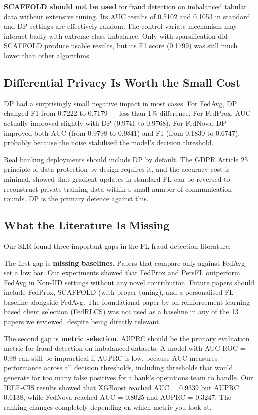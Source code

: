 \documentclass[12pt, a4paper]{article}
\begin{document}
\textbf{SCAFFOLD should not be used} for fraud detection on imbalanced tabular data without extensive tuning. Its AUC results of 0.5102 and 0.1053 in standard and DP settings are effectively random. The control variate mechanism may interact badly with extreme class imbalance. Only with sparsification did SCAFFOLD produce usable results, but its F1 score (0.1799) was still much lower than other algorithms.

\subsection{Differential Privacy Is Worth the Small Cost}

DP had a surprisingly small negative impact in most cases. For FedAvg, DP changed F1 from 0.7222 to 0.7179 --- less than 1\% difference. For FedProx, AUC actually improved slightly with DP (0.9741 to 0.9768). For FedNova, DP improved both AUC (from 0.9798 to 0.9841) and F1 (from 0.1830 to 0.6747), probably because the noise stabilised the model's decision threshold.

Real banking deployments should include DP by default. The GDPR Article 25 principle of data protection by design requires it, and the accuracy cost is minimal. \citet{zhu2019deep} showed that gradient updates in standard FL can be reversed to reconstruct private training data within a small number of communication rounds. DP is the primary defence against this.

\subsection{What the Literature Is Missing}

Our SLR found three important gaps in the FL fraud detection literature.

The first gap is \textbf{missing baselines}. Papers that compare only against FedAvg set a low bar. Our experiments showed that FedProx and PersFL outperform FedAvg in Non-IID settings without any novel contribution. Future papers should include FedProx, SCAFFOLD (with proper tuning), and a personalised FL baseline alongside FedAvg. The foundational paper by \citet{wang2023fedrlcs} on reinforcement learning-based client selection (FedRLCS) was not used as a baseline in any of the 13 papers we reviewed, despite being directly relevant.

The second gap is \textbf{metric selection}. AUPRC should be the primary evaluation metric for fraud detection on imbalanced datasets. A model with AUC-ROC = 0.98 can still be impractical if AUPRC is low, because AUC measures performance across all decision thresholds, including thresholds that would generate far too many false positives for a bank's operations team to handle. Our IEEE-CIS results showed that XGBoost reached AUC = 0.9339 but AUPRC = 0.6138, while FedNova reached AUC = 0.8025 and AUPRC = 0.3247. The ranking changes completely depending on which metric you look at.
\end{document}
